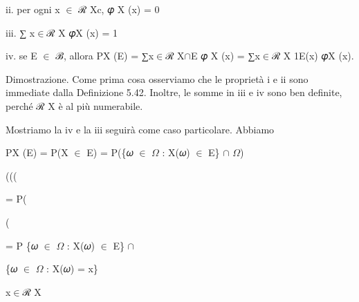 \documentclass[a4paper,portrait,12pt]{article}
\begin{document}
\begin{flushleft}
ii. per ogni x $\in$ ℛ Xc, 𝜑 X (x) = 0
\end{flushleft}


\begin{flushleft}
iii. ∑ x$\in$ℛ X 𝜑X (x) = 1
\end{flushleft}





\begin{flushleft}
iv. se E $\in$ ℬ, allora PX (E) = ∑x$\in$ℛ X$\cap$E 𝜑 X (x) = ∑x$\in$ℛ X 1E(x) 𝜑X (x).
\end{flushleft}





\begin{flushleft}
Dimostrazione. Come prima cosa osserviamo che le propriet\`{a} i e ii sono immediate dalla Definizione 5.42. Inoltre, le somme in iii e iv sono ben definite, perch\'{e} ℛ X \`{e} al più numerabile.
\end{flushleft}


\begin{flushleft}
Mostriamo la iv e la iii seguir\`{a} come caso particolare. Abbiamo
\end{flushleft}


\begin{flushleft}
PX (E) = P(X $\in$ E) = P(\{𝜔 $\in$ $\Omega$ : X(𝜔) $\in$ E\} $\cap$ $\Omega$)
\end{flushleft}





(((


\begin{flushleft}
= P(
\end{flushleft}


(





\begin{flushleft}
= P \{𝜔 $\in$ $\Omega$ : X(𝜔) $\in$ E\} $\cap$
\end{flushleft}





\begin{flushleft}
\{𝜔 $\in$ $\Omega$ : X(𝜔) = x\}
\end{flushleft}


\begin{flushleft}
x$\in$ℛ X
\end{flushleft}
\end{document}
